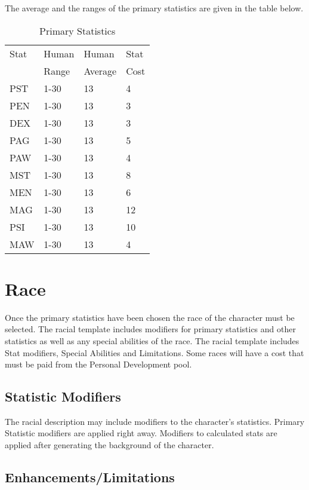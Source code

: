 The average and the ranges of the primary statistics are given in the table
below.

\begin{table}[h]
	\begin{tabular}{llll}
	Stat & Human    & Human  & Stat \\
             & Range	& Average & Cost \\
	\hline
	PST & 1-30		& 13  & 4 \\
	PEN & 1-30		& 13  & 3 \\
	DEX & 1-30		& 13  & 3 \\
	PAG & 1-30		& 13  & 5 \\
	PAW & 1-30		& 13  & 4 \\
	MST & 1-30		& 13  & 8 \\
	MEN & 1-30		& 13  & 6 \\
	MAG & 1-30		& 13  & 12 \\
	PSI & 1-30		& 13  & 10 \\
	MAW & 1-30		& 13  & 4 \\
	\end{tabular}
    \caption{Primary Statistics}
\end{table}

\section{Race}

Once the primary statistics have been chosen the race of the character
must be selected. The racial template includes modifiers for primary
statistics and other statistics as well as any special abilities of the
race. The racial template includes Stat modifiers, Special Abilities and
Limitations. Some races will have a cost that must be paid from the 
Personal Development pool.

\subsection{Statistic Modifiers}

The racial description may include modifiers to the character's statistics.
Primary Statistic modifiers are applied right away. Modifiers to calculated 
stats are applied after generating the background of the character.

\subsection{Enhancements/Limitations}

